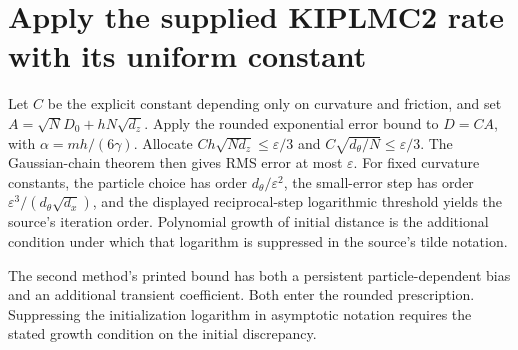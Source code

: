 \documentclass[11pt,a4paper]{article}
\begin{document}
\section{\texorpdfstring{Apply the supplied KIPLMC2 rate with its uniform constant}{Apply the supplied KIPLMC2 rate with its uniform constant}}


Let \(C\) be the explicit constant depending only on curvature and friction, and set \(A=\sqrt N D_0+hN\sqrt{d_z}\). Apply the rounded exponential error bound to \(D=CA\), with \(\alpha=mh/(6\gamma)\). Allocate \(Ch\sqrt{Nd_z}\le\varepsilon/3\) and \(C\sqrt{d_\theta/N}\le\varepsilon/3\). The Gaussian-chain theorem then gives RMS error at most \(\varepsilon\). For fixed curvature constants, the particle choice has order \(d_\theta/\varepsilon^2\), the small-error step has order \(\varepsilon^3/(d_\theta\sqrt{d_x})\), and the displayed reciprocal-step logarithmic threshold yields the source’s iteration order. Polynomial growth of initial distance is the additional condition under which that logarithm is suppressed in the source’s tilde notation.



The second method’s printed bound has both a persistent particle-dependent bias and an additional transient coefficient. Both enter the rounded prescription. Suppressing the initialization logarithm in asymptotic notation requires the stated growth condition on the initial discrepancy.
\end{document}
